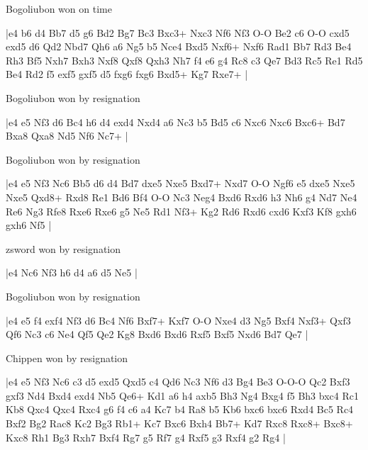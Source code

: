 \showboard

Bogoliubon won on time

\makegametitle
|e4 b6 d4 Bb7 d5 g6 Bd2 Bg7 Bc3 Bxc3+ Nxc3 Nf6 Nf3 O-O Be2 c6 O-O cxd5 exd5 d6 Qd2 Nbd7 Qh6 a6 Ng5 b5 Nce4 Bxd5 Nxf6+ Nxf6 Rad1 Bb7 Rd3 Be4 Rh3 Bf5 Nxh7 Bxh3 Nxf8 Qxf8 Qxh3 Nh7 f4 e6 g4 Rc8 c3 Qe7 Bd3 Rc5 Re1 Rd5 Be4 Rd2 f5 exf5 gxf5 d5 fxg6 fxg6 Bxd5+ Kg7 Rxe7+  |

\showboard

Bogoliubon won by resignation

\makegametitle
|e4 e5 Nf3 d6 Bc4 h6 d4 exd4 Nxd4 a6 Nc3 b5 Bd5 c6 Nxc6 Nxc6 Bxc6+ Bd7 Bxa8 Qxa8 Nd5 Nf6 Nc7+  |

\showboard

Bogoliubon won by resignation

\makegametitle
|e4 e5 Nf3 Nc6 Bb5 d6 d4 Bd7 dxe5 Nxe5 Bxd7+ Nxd7 O-O Ngf6 e5 dxe5 Nxe5 Nxe5 Qxd8+ Rxd8 Re1 Bd6 Bf4 O-O Nc3 Neg4 Bxd6 Rxd6 h3 Nh6 g4 Nd7 Ne4 Re6 Ng3 Rfe8 Rxe6 Rxe6 g5 Ne5 Rd1 Nf3+ Kg2 Rd6 Rxd6 cxd6 Kxf3 Kf8 gxh6 gxh6 Nf5  |

\showboard

zsword won by resignation

\makegametitle
|e4 Nc6 Nf3 h6 d4 a6 d5 Ne5  |

\showboard

Bogoliubon won by resignation

\makegametitle
|e4 e5 f4 exf4 Nf3 d6 Bc4 Nf6 Bxf7+ Kxf7 O-O Nxe4 d3 Ng5 Bxf4 Nxf3+ Qxf3 Qf6 Nc3 c6 Ne4 Qf5 Qe2 Kg8 Bxd6 Bxd6 Rxf5 Bxf5 Nxd6 Bd7 Qe7  |

\showboard

Chippen won by resignation

\makegametitle
|e4 e5 Nf3 Nc6 c3 d5 exd5 Qxd5 c4 Qd6 Nc3 Nf6 d3 Bg4 Be3 O-O-O Qc2 Bxf3 gxf3 Nd4 Bxd4 exd4 Nb5 Qe6+ Kd1 a6 h4 axb5 Bh3 Ng4 Bxg4 f5 Bh3 bxc4 Rc1 Kb8 Qxc4 Qxc4 Rxc4 g6 f4 c6 a4 Kc7 b4 Ra8 b5 Kb6 bxc6 bxc6 Rxd4 Bc5 Rc4 Bxf2 Bg2 Rac8 Kc2 Bg3 Rb1+ Kc7 Bxc6 Bxh4 Bb7+ Kd7 Rxc8 Rxc8+ Bxc8+ Kxc8 Rh1 Bg3 Rxh7 Bxf4 Rg7 g5 Rf7 g4 Rxf5 g3 Rxf4 g2 Rg4  |

